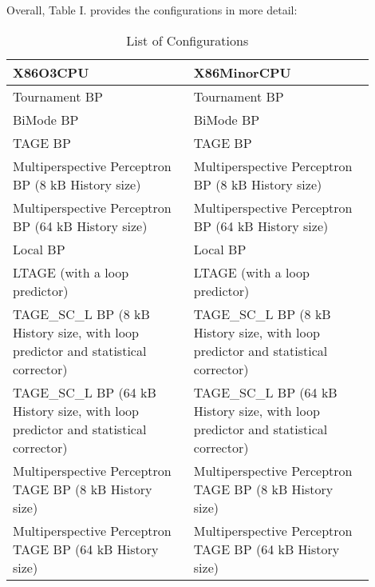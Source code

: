 \documentclass[twocolumn,showpacs,%
  nofootinbib,aps,superscriptaddress,%
  eqsecnum,prd,notitlepage,showkeys,10pt]{revtex4-1}
\begin{document}
Overall, Table I. provides the configurations in more detail:

\begin{table}
\centering
\caption{List of Configurations}
\small
\begin{tabular}{|p{0.45\linewidth}|p{0.45\linewidth}|}
\hline
X86O3CPU & X86MinorCPU \\
\hline
Tournament BP & Tournament BP \\
BiMode BP & BiMode BP \\
TAGE BP & TAGE BP \\
Multiperspective Perceptron BP (8 kB History size) & Multiperspective Perceptron BP (8 kB History size) \\
Multiperspective Perceptron BP (64 kB History size) & Multiperspective Perceptron BP (64 kB History size) \\
Local BP & Local BP \\
LTAGE (with a loop predictor) & LTAGE (with a loop predictor) \\
TAGE\_SC\_L BP (8 kB History size, with loop predictor and statistical corrector) & TAGE\_SC\_L BP (8 kB History size, with loop predictor and statistical corrector) \\
TAGE\_SC\_L BP (64 kB History size, with loop predictor and statistical corrector) & TAGE\_SC\_L BP (64 kB History size, with loop predictor and statistical corrector) \\
Multiperspective Perceptron TAGE BP (8 kB History size) & Multiperspective Perceptron TAGE BP (8 kB History size) \\
Multiperspective Perceptron TAGE BP (64 kB History size) & Multiperspective Perceptron TAGE BP (64 kB History size) \\
\hline
\end{tabular}
\end{table}


\end{document}
